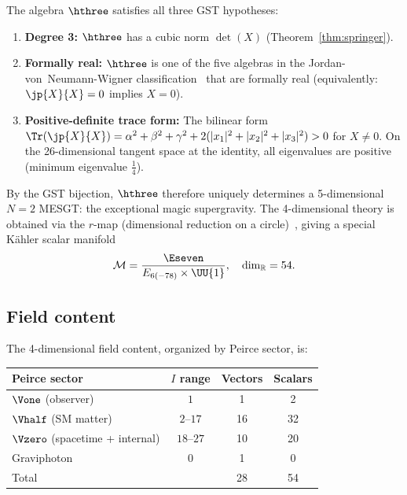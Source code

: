 \begin{proposition}
\label{prop:gst-hypotheses}
The algebra $\hthree$ satisfies all three GST hypotheses:
\begin{enumerate}[label=(H\arabic*)]
\item \textbf{Degree 3:} $\hthree$ has a cubic norm $\det(X)$
  (Theorem~\ref{thm:springer}).
\item \textbf{Formally real:} $\hthree$ is one of the five algebras
  in the Jordan-von~Neumann-Wigner
  classification~\cite{JordanVonNeumannWigner1934} that are formally
  real (equivalently: $\jp{X}{X} = 0$ implies $X = 0$).
\item \textbf{Positive-definite trace form:} The bilinear form
  $\Tr(\jp{X}{X}) = \alpha^2 + \beta^2 + \gamma^2 + 2(|x_1|^2 +
  |x_2|^2 + |x_3|^2) > 0$ for $X \neq 0$. On the 26-dimensional
  tangent space at the identity, all eigenvalues are positive
  (minimum eigenvalue $\frac{1}{4}$).
\end{enumerate}
\end{proposition}

By the GST bijection, $\hthree$ therefore uniquely determines a
5-dimensional $N{=}2$ MESGT: the exceptional magic supergravity.
The 4-dimensional theory is obtained via the $r$-map (dimensional
reduction on a circle)~\cite{deWitVanProeyen1992}, giving a special
K\"ahler scalar manifold
\begin{equation}
\label{eq:scalar-manifold}
\mathcal{M} = \frac{\Eseven}{E_{6(-78)} \times \UU{1}},
\quad \dim_{\mathbb{R}} = 54.
\end{equation}

\subsection{Field content}

The 4-dimensional field content, organized by Peirce sector, is:

\begin{center}
\begin{tabular}{lccc}
\toprule
Peirce sector & $I$ range & Vectors & Scalars \\
\midrule
$\Vone$ (observer) & $1$ & 1 & 2 \\
$\Vhalf$ (SM matter) & $2$--$17$ & 16 & 32 \\
$\Vzero$ (spacetime + internal) & $18$--$27$ & 10 & 20 \\
Graviphoton & $0$ & 1 & 0 \\
\midrule
Total & & 28 & 54 \\
\bottomrule
\end{tabular}
\end{center}

